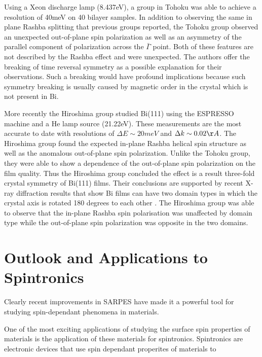 \documentclass[12pt]{article}
\begin{document}
Using a Xeon discharge lamp (8.437eV), a group in Tohoku was able to achieve a resolution of 40meV on 40 bilayer samples\cite{Takayama}.
In addition to observing the same in plane Rashba splitting that previous groups reported, the Tohoku group observed an unexpected out-of-plane spin polarization as well as an asymmetry of the parallel component of polarization across the $\bar{\Gamma}$ point.
Both of these features are not described by the Rashba effect and were unexpected.
The authors offer the breaking of time reversal symmetry as a possible explanation for their observations.
Such a breaking would have profound implications because such symmetry breaking is usually caused by magnetic order in the crystal which is not present in Bi.

More recently the Hiroshima group studied Bi(111) using the ESPRESSO machine and a He lamp source (21.22eV)\cite{Miyahara}.
These measurements are the most accurate to date with resolutions of $\Delta E\sim20meV$ and $\Delta k\sim0.02\AA$.
The Hiroshima group found the expected in-plane Rashba helical spin structure as well as the anomalous out-of-plane spin polarization.
Unlike the Tohoku group, they were able to show a dependence of the out-of-plane spin polarization on the film quality.
Thus the Hiroshima group concluded the effect is a result three-fold crystal symmetry of Bi(111) films.
Their conclusions are supported by recent X-ray diffraction results that show Bi films can have two domain types in which the crystal axis is rotated 180 degrees to each other \cite{Shirasawa}.
The Hiroshima group was able to observe that the in-plane Rashba spin polarisation was unaffected by domain type while the out-of-plane spin polarization was opposite in the two domains.

\section{Outlook and Applications to Spintronics}
Clearly recent improvements in SARPES have made it a powerful tool for studying spin-dependant phenomena in materials.

One of the most exciting applications of studying the surface spin properties of materials is the application of these materials for spintronics.
Spintronics are electronic devices that use spin dependant properites of materials to 

\printbibliography
\end{document}
